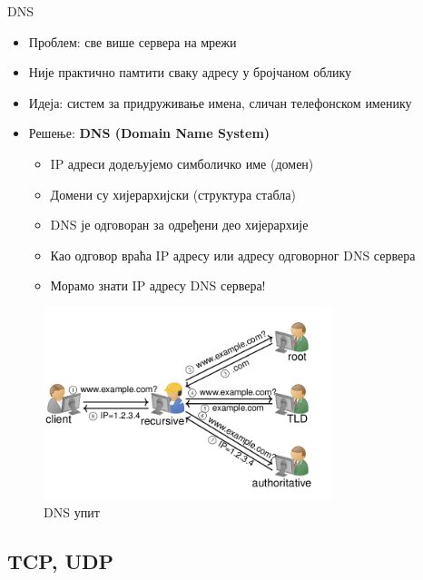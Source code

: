 \documentclass{beamer}
\begin{document}
    \begin{frame}[allowframebreaks]{DNS}
        \begin{itemize}
            \item Проблем: све више сервера на мрежи
            \item Није практично памтити сваку адресу у бројчаном облику
            \item Идеја: систем за придруживање имена, сличан телефонском именику
            \item Решење: \textbf{DNS (Domain Name System)}
            \begin{itemize}
                \item IP адреси додељујемо симболичко име (домен)
                \item Домени су хијерархијски (структура стабла)
                \item DNS је одговоран за одређени део хијерархије
                \item Као одговор враћа IP адресу или адресу одговорног DNS сервера
                \item Морамо знати IP адресу DNS сервера!
            \end{itemize}
        \end{itemize}

        \framebreak

        \begin{figure}
            \centering
            \includegraphics[width=0.75\textwidth]{images/dns.png}
            \caption{DNS упит}
            \label{fig:dns}
        \end{figure}
    \end{frame}
    
    \subsection{TCP, UDP}
    
\end{document}
